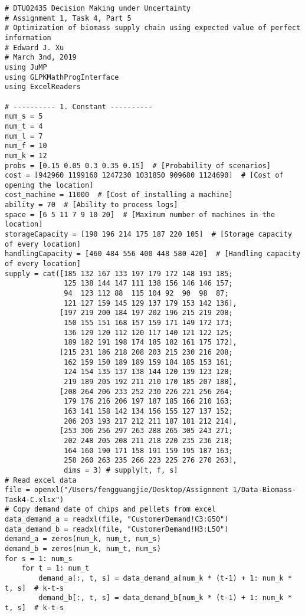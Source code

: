 \documentclass[fleqn,10pt]{wlscirep}
\begin{document}
\begin{lstlisting}
# DTU02435 Decision Making under Uncertainty
# Assignment 1, Task 4, Part 5
# Optimization of biomass supply chain using expected value of perfect information
# Edward J. Xu
# March 3nd, 2019
using JuMP
using GLPKMathProgInterface
using ExcelReaders

# ---------- 1. Constant ----------
num_s = 5
num_t = 4
num_l = 7
num_f = 10
num_k = 12
probs = [0.15 0.05 0.3 0.35 0.15]  # [Probability of scenarios]
cost = [942960 1199160 1247230 1031850 909680 1124690]  # [Cost of opening the location]
cost_machine = 11000  # [Cost of installing a machine]
ability = 70  # [Ability to process logs]
space = [6 5 11 7 9 10 20]  # [Maximum number of machines in the location]
storageCapacity = [190 196 214 175 187 220 105]  # [Storage capacity of every location]
handlingCapacity = [460 484 556 400 448 580 420]  # [Handling capacity of every location]
supply = cat([185 132 167 133 197 179 172 148 193 185;
              125 138 144 147 111 138 156 146 146 157;
              94  123 112 88  115 104 92  90  98  87;
              121 127 159 145 129 137 179 153 142 136],
             [197 219 200 184 197 202 196 215 219 208;
              150 155 151 168 157 159 171 149 172 173;
              136 129 120 112 120 117 140 121 122 125;
              189 182 191 198 174 185 182 161 175 172],
             [215 231 186 218 208 203 215 230 216 208;
              162 159 150 189 189 159 184 185 153 161;
              124 154 135 137 138 144 120 139 123 128;
              219 189 205 192 211 210 170 185 207 188],
             [208 264 206 233 252 230 226 221 256 264;
              179 176 216 206 197 187 185 166 210 163;
              163 141 158 142 134 156 155 127 137 152;
              206 203 193 217 212 211 187 181 212 214],
             [253 306 256 297 263 288 265 305 243 271;
              202 248 205 208 211 218 220 235 236 218;
              164 160 190 171 158 191 159 195 187 163;
              258 260 263 235 266 223 225 276 270 263],
              dims = 3) # supply[t, f, s]
# Read excel data
file = openxl("/Users/fengguangjie/Desktop/Assignment 1/Data-Biomass-Task4-C.xlsx")
# Copy demand date of chips and pellets from excel
data_demand_a = readxl(file, "CustomerDemand!C3:G50")
data_demand_b = readxl(file, "CustomerDemand!H3:L50")
demand_a = zeros(num_k, num_t, num_s)
demand_b = zeros(num_k, num_t, num_s)
for s = 1: num_s
    for t = 1: num_t
        demand_a[:, t, s] = data_demand_a[num_k * (t-1) + 1: num_k * t, s]  # k-t-s
        demand_b[:, t, s] = data_demand_b[num_k * (t-1) + 1: num_k * t, s]  # k-t-s

\end{lstlisting}
\end{document}
